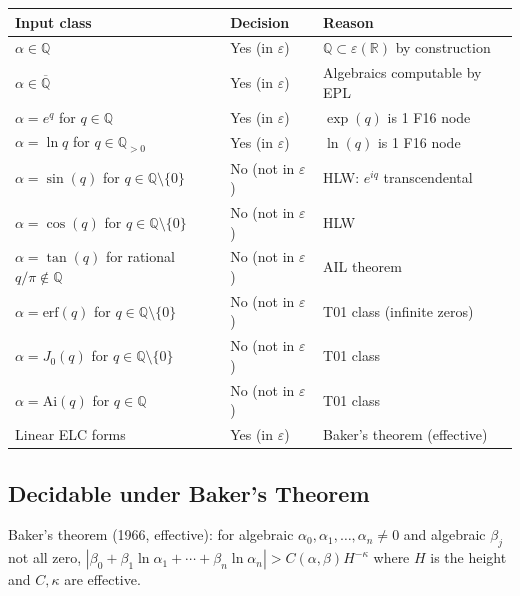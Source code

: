 \documentclass[11pt]{article}
\begin{document}
\begin{center}
\renewcommand{\arraystretch}{1.2}
\begin{tabular}{lll}
\toprule
Input class & Decision & Reason \\
\midrule
$\alpha \in \mathbb{Q}$ & Yes (in $\varepsilon$) & $\mathbb{Q} \subset \varepsilon(\mathbb{R})$ by construction \\
$\alpha \in \overline{\mathbb{Q}}$ & Yes (in $\varepsilon$) & Algebraics computable by EPL \\
$\alpha = e^q$ for $q \in \mathbb{Q}$ & Yes (in $\varepsilon$) & $\exp(q)$ is 1 F16 node \\
$\alpha = \ln q$ for $q \in \mathbb{Q}_{>0}$ & Yes (in $\varepsilon$) & $\ln(q)$ is 1 F16 node \\
$\alpha = \sin(q)$ for $q \in \mathbb{Q} \setminus \{0\}$ & No (not in $\varepsilon$) & HLW: $e^{iq}$ transcendental \\
$\alpha = \cos(q)$ for $q \in \mathbb{Q} \setminus \{0\}$ & No (not in $\varepsilon$) & HLW \\
$\alpha = \tan(q)$ for rational $q/\pi \notin \mathbb{Q}$ & No (not in $\varepsilon$) & AIL theorem \\
$\alpha = \mathrm{erf}(q)$ for $q \in \mathbb{Q} \setminus \{0\}$ & No (not in $\varepsilon$) & T01 class (infinite zeros) \\
$\alpha = J_0(q)$ for $q \in \mathbb{Q} \setminus \{0\}$ & No (not in $\varepsilon$) & T01 class \\
$\alpha = \mathrm{Ai}(q)$ for $q \in \mathbb{Q}$ & No (not in $\varepsilon$) & T01 class \\
Linear ELC forms & Yes (in $\varepsilon$) & Baker's theorem (effective) \\
\bottomrule
\end{tabular}
\end{center}

\subsection{Decidable under Baker's Theorem}

Baker's theorem (1966, effective): for algebraic $\alpha_0, \alpha_1, \ldots, \alpha_n \neq 0$
and algebraic $\beta_j$ not all zero,
$|\beta_0 + \beta_1 \ln \alpha_1 + \cdots + \beta_n \ln \alpha_n| > C(\alpha,\beta) H^{-\kappa}$
where $H$ is the height and $C, \kappa$ are effective.
\end{document}
